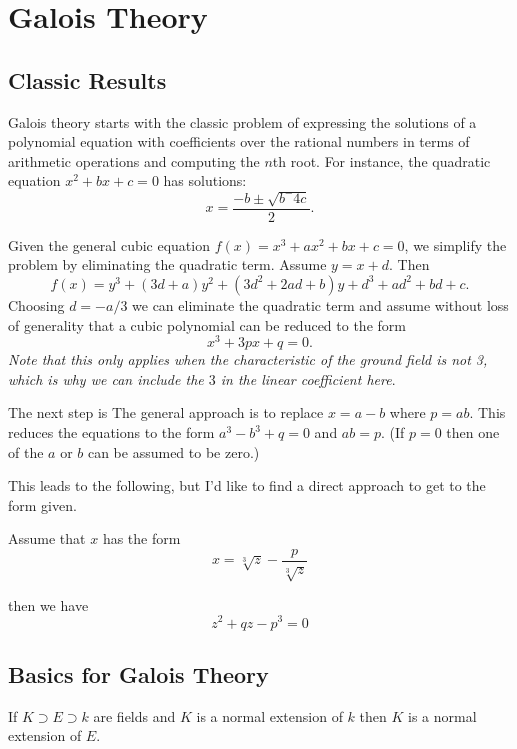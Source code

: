 \chapter{Galois Theory}
\label{Galois:Chap}

\section{Classic Results}
Galois theory starts with the classic problem of expressing the solutions of a polynomial equation with coefficients over the rational numbers in terms of arithmetic operations and computing the $n$th root.  For instance, the quadratic equation $x^2 + b x + c = 0$ has solutions:
\[
x = \frac{-b \pm \sqrt{b^ - 4c}}{2}.
\]

Given the general cubic equation $f(x) = x^3 + ax^2 + bx + c = 0$, we simplify the problem by eliminating the quadratic term.  Assume $y = x + d$. Then
\[
f(x) = y^3 + (3d + a) y^2 + (3d^2 + 2ad + b) y + d^3 + ad^2 +bd +c.
\]
Choosing $d = - a/3$ we can eliminate the quadratic term and assume without loss of generality 
that a cubic polynomial can be reduced to the form 
\begin{equation}
    x^3 + 3px + q = 0.
\end{equation}
\textit{Note that this only applies when the characteristic of the ground field is not 3, which is why we can include the $3$ in the linear coefficient here}.

The next step is The general approach is to replace $x = a - b$ where $p = ab$.  This reduces the equations to the form $a^3 - b^3 + q = 0$ and $ab = p$. (If $p = 0$ then one of the $a$ or $b$ can be assumed to be zero.)  

This leads to the following, but I'd like to find a direct approach to get to the form given.


Assume that $x$ has the form
\[
    x = \sqrt[3]{z} - \frac{p}{\sqrt[3]{z}}
\]

then we have
\begin{equation}
    z^2 + q z - p^3 = 0
\end{equation}


\section{Basics for Galois Theory}
\label{Galois:Basics:Sec}
\begin{proposition}
If $K \supset E \supset k$ are fields and $K$ is a normal extension of $k$
then $K$ is a normal extension of $E$.
\end{proposition}


